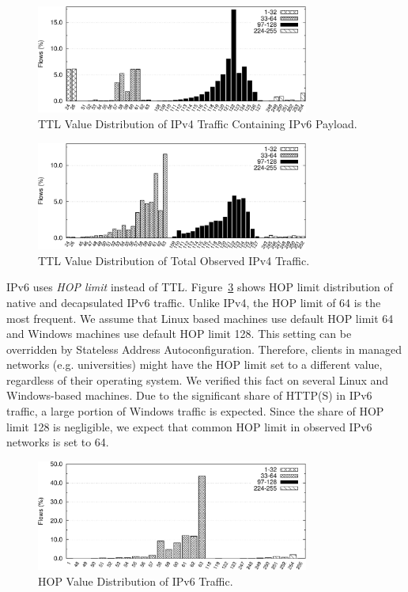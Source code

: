 \begin{figure}[tb]
    \centering
    \includegraphics[width=0.8\textwidth]{figures/paper-tunnels/ttl/ttl}
    \caption{TTL Value Distribution of IPv4 Traffic Containing IPv6 Payload.}
    \label{fig:ipv6-tunnels-ipv4-ttl}
\end{figure}

\begin{figure}[tb]
    \centering
    \includegraphics[width=0.8\textwidth]{figures/paper-tunnels/ttl/ttl4}
    \caption{TTL Value Distribution of Total Observed IPv4 Traffic.}
    \label{fig:ipv6-tunnels-ipv4-ttl4}
\end{figure}

IPv6 uses \textit{HOP limit} instead of TTL. Figure~\ref{fig:ipv6-tunnels-ipv6-native-hop} shows HOP limit distribution of native and decapsulated IPv6 traffic. Unlike IPv4, the HOP limit of 64 is the most frequent. We assume that Linux based machines use default HOP limit 64 and Windows machines use default HOP limit 128. This setting can be overridden by Stateless Address Autoconfiguration. Therefore, clients in managed networks (e.g. universities) might have the HOP limit set to a different value, regardless of their operating system. We verified this fact on several Linux and Windows-based machines. Due to the significant share of HTTP(S) in IPv6 traffic, a large portion of Windows traffic is expected. Since the share of HOP limit 128 is negligible, we expect that common HOP limit in observed IPv6 networks is set to 64.

\begin{figure}[tb]
        \centering
        \includegraphics[width=0.8\textwidth]{figures/paper-tunnels/ttl/native-hop}
        \caption{HOP Value Distribution of IPv6 Traffic.}
        \label{fig:ipv6-tunnels-ipv6-native-hop}
\end{figure}



